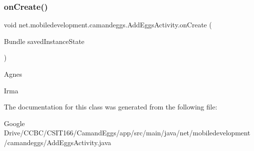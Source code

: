 \subsubsection{\texorpdfstring{on\+Create()}{onCreate()}}
{\footnotesize\ttfamily void net.\+mobiledevelopment.\+camandeggs.\+Add\+Eggs\+Activity.\+on\+Create (\begin{DoxyParamCaption}\item[{Bundle}]{saved\+Instance\+State }\end{DoxyParamCaption})\hspace{0.3cm}{\ttfamily [protected]}}

Agnes

Irma

The documentation for this class was generated from the following file\+:\begin{DoxyCompactItemize}
\item 
Google Drive/\+C\+C\+B\+C/\+C\+S\+I\+T166/\+Camand\+Eggs/app/src/main/java/net/mobiledevelopment/camandeggs/Add\+Eggs\+Activity.\+java\end{DoxyCompactItemize}
